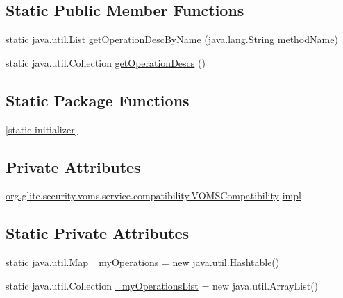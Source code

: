 \subsection*{Static Public Member Functions}
\begin{DoxyCompactItemize}
\item 
static java.util.List \hyperlink{classorg_1_1glite_1_1security_1_1voms_1_1service_1_1compatibility_1_1VOMSCompatibilitySoapBindingSkeleton_afb681a779abae3604d374419e7fba672}{getOperationDescByName} (java.lang.String methodName)
\item 
static java.util.Collection \hyperlink{classorg_1_1glite_1_1security_1_1voms_1_1service_1_1compatibility_1_1VOMSCompatibilitySoapBindingSkeleton_aa144d5583f0d8b7e0e64ad2af8008061}{getOperationDescs} ()
\end{DoxyCompactItemize}
\subsection*{Static Package Functions}
\begin{DoxyCompactItemize}
\item 
\hyperlink{classorg_1_1glite_1_1security_1_1voms_1_1service_1_1compatibility_1_1VOMSCompatibilitySoapBindingSkeleton_a2e0c826c513bc12f8b338ea3e2ad7473}{\mbox{[}static initializer\mbox{]}}
\end{DoxyCompactItemize}
\subsection*{Private Attributes}
\begin{DoxyCompactItemize}
\item 
\hyperlink{interfaceorg_1_1glite_1_1security_1_1voms_1_1service_1_1compatibility_1_1VOMSCompatibility}{org.glite.security.voms.service.compatibility.VOMSCompatibility} \hyperlink{classorg_1_1glite_1_1security_1_1voms_1_1service_1_1compatibility_1_1VOMSCompatibilitySoapBindingSkeleton_a36ff3050b5c95f7655bd883de30eaaca}{impl}
\end{DoxyCompactItemize}
\subsection*{Static Private Attributes}
\begin{DoxyCompactItemize}
\item 
static java.util.Map \hyperlink{classorg_1_1glite_1_1security_1_1voms_1_1service_1_1compatibility_1_1VOMSCompatibilitySoapBindingSkeleton_a64389624da6e025d110bdf5b8494820b}{\_\-myOperations} = new java.util.Hashtable()
\item 
static java.util.Collection \hyperlink{classorg_1_1glite_1_1security_1_1voms_1_1service_1_1compatibility_1_1VOMSCompatibilitySoapBindingSkeleton_ac973db4cd89cadbb48c3fd8179b575c4}{\_\-myOperationsList} = new java.util.ArrayList()
\end{DoxyCompactItemize}


